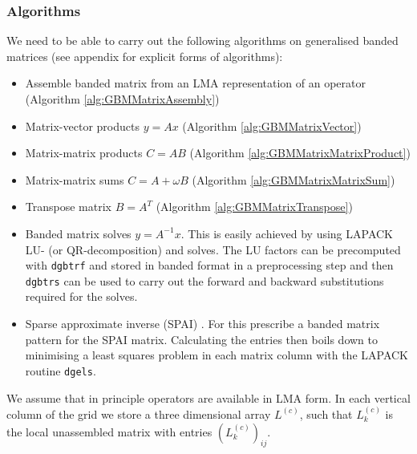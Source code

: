\documentclass[10pt]{article}
\begin{document}
\subsubsection{Algorithms}
We need to be able to carry out the following algorithms on generalised banded matrices (see appendix for explicit forms of algorithms):
\begin{itemize}
  \item Assemble banded matrix from an LMA representation of an operator (Algorithm \ref{alg:GBMMatrixAssembly})
  \item Matrix-vector products $y=Ax$ (Algorithm \ref{alg:GBMMatrixVector})
  \item Matrix-matrix products $C=AB$ (Algorithm \ref{alg:GBMMatrixMatrixProduct})
  \item Matrix-matrix sums $C=A+\omega B$ (Algorithm \ref{alg:GBMMatrixMatrixSum})
  \item Transpose matrix $B=A^T$ (Algorithm \ref{alg:GBMMatrixTranspose})
  \item Banded matrix solves $y=A^{-1}x$. This is easily achieved by using LAPACK LU- (or QR-decomposition) and solves. The LU factors can be precomputed with \texttt{dgbtrf} and stored in banded format in a preprocessing step and then \texttt{dgbtrs} can be used to carry out the forward and backward substitutions required for the solves.
  \item Sparse approximate inverse (SPAI) \cite{Grote1997}. For this prescribe a banded matrix pattern for the SPAI matrix. Calculating the entries then boils down to minimising a least squares problem in each matrix column with the LAPACK routine \texttt{dgels}.
\end{itemize}
We assume that in principle operators are available in LMA form. In each vertical column of the grid we store a three dimensional array $L^{(c)}$, such that $L^{(c)}_k$ is the local unassembled matrix with entries $\left(L^{(c)}_k\right)_{ij}$.
\end{document}
